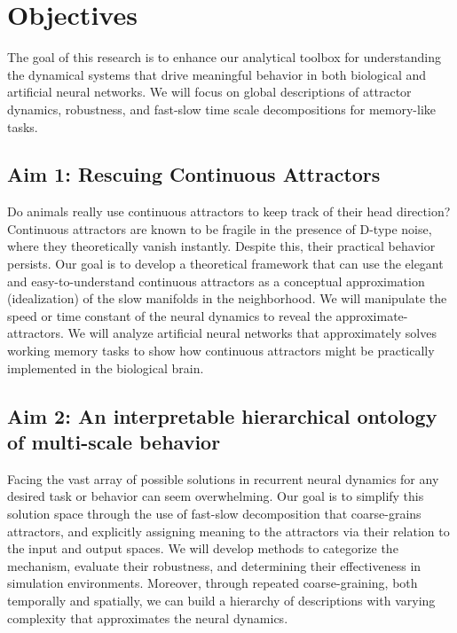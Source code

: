 \documentclass[12pt,letterpaper, onecolumn]{article}
\theoremstyle{definition}
\theoremstyle{remark}
\begin{document}
%


\newpage
\section{Objectives}

The goal of this research is to enhance our analytical toolbox for understanding the dynamical systems that drive meaningful behavior in both biological and artificial neural networks.
We will focus on global descriptions of attractor dynamics, robustness, and fast-slow time scale decompositions for memory-like tasks.

\subsection*{Aim 1: Rescuing Continuous Attractors}
Do animals really use continuous attractors to keep track of their head direction?
Continuous attractors are known to be fragile in the presence of D-type noise, where they theoretically vanish instantly.
Despite this, their practical behavior persists.
Our goal is to develop a theoretical framework that can use the elegant and easy-to-understand continuous attractors as a conceptual approximation (idealization) of the slow manifolds in the neighborhood.
We will manipulate the speed or time constant of the neural dynamics to reveal the approximate-attractors.
We will analyze artificial neural networks that approximately solves working memory tasks to show how continuous attractors might be practically implemented in the biological brain.

\subsection*{Aim 2: An interpretable hierarchical ontology of multi-scale behavior}
Facing the vast array of possible solutions in recurrent neural dynamics for any desired task or behavior can seem overwhelming.
Our goal is to simplify this solution space through the use of fast-slow decomposition that coarse-grains attractors, and explicitly assigning meaning to the attractors via their relation to the input and output spaces.
We will develop methods to categorize the mechanism, evaluate their robustness, and determining their effectiveness in simulation environments.
Moreover, through repeated coarse-graining, both temporally and spatially, we can build a hierarchy of descriptions with varying complexity that approximates the neural dynamics.
\end{document}

